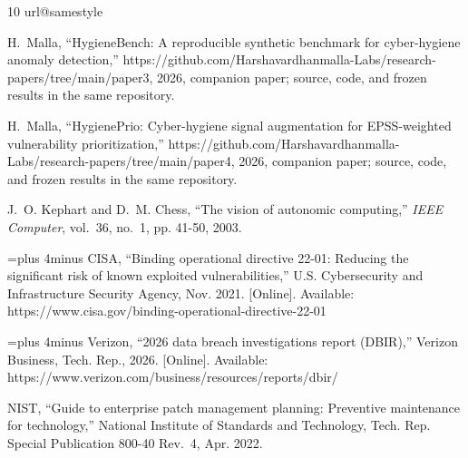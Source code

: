 \documentclass[journal]{IEEEtran}
\begin{document}
\begin{thebibliography}{10}
\providecommand{\url}[1]{#1}
\csname url@samestyle\endcsname
\providecommand{\newblock}{\relax}
\providecommand{\bibinfo}[2]{#2}
\providecommand{\BIBentrySTDinterwordspacing}{\spaceskip=0pt\relax}
\providecommand{\BIBentryALTinterwordstretchfactor}{4}
\providecommand{\BIBentryALTinterwordspacing}{\spaceskip=\fontdimen2\font plus
\BIBentryALTinterwordstretchfactor\fontdimen3\font minus
  \fontdimen4\font\relax}
\providecommand{\BIBforeignlanguage}[2]{{%
\expandafter\ifx\csname l@#1\endcsname\relax
\typeout{** WARNING: IEEEtran.bst: No hyphenation pattern has been}%
\typeout{** loaded for the language `#1'. Using the pattern for}%
\typeout{** the default language instead.}%
\else
\language=\csname l@#1\endcsname
\fi
#2}}
\providecommand{\BIBdecl}{\relax}
\BIBdecl

H.~Malla, ``{HygieneBench}: A reproducible synthetic benchmark for
  cyber-hygiene anomaly detection,''
  \url{https://github.com/Harshavardhanmalla-Labs/research-papers/tree/main/paper3},
  2026, companion paper; source, code, and frozen results in the same
  repository.

H.~Malla, ``{HygienePrio}: Cyber-hygiene signal augmentation for
  {EPSS}-weighted vulnerability prioritization,''
  \url{https://github.com/Harshavardhanmalla-Labs/research-papers/tree/main/paper4},
  2026, companion paper; source, code, and frozen results in the same
  repository.

J.~O. Kephart and D.~M. Chess, ``The vision of autonomic computing,''
  \emph{IEEE Computer}, vol.~36, no.~1, pp. 41-50, 2003.

\BIBentryALTinterwordspacing
{CISA}, ``Binding operational directive 22-01: Reducing the significant risk of
  known exploited vulnerabilities,'' U.S. Cybersecurity and Infrastructure
  Security Agency, Nov. 2021. [Online]. Available:
  \url{https://www.cisa.gov/binding-operational-directive-22-01}
\BIBentrySTDinterwordspacing

\BIBentryALTinterwordspacing
{Verizon}, ``2026 data breach investigations report ({DBIR}),'' Verizon
  Business, Tech. Rep., 2026. [Online]. Available:
  \url{https://www.verizon.com/business/resources/reports/dbir/}
\BIBentrySTDinterwordspacing

{NIST}, ``Guide to enterprise patch management planning: Preventive maintenance
  for technology,'' National Institute of Standards and Technology, Tech. Rep.
  Special Publication 800-40 Rev.~4, Apr. 2022.


\end{thebibliography}
\end{document}
